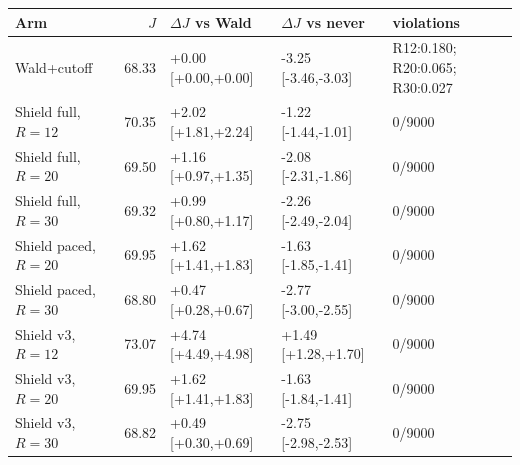 \begin{tabular}{@{}l r l l l@{}}
\toprule
Arm & $J$ & $\Delta J$ vs Wald & $\Delta J$ vs never & violations \\
\midrule
Wald+cutoff & 68.33 & +0.00 [+0.00,+0.00] & -3.25 [-3.46,-3.03] & R12:0.180; R20:0.065; R30:0.027 \\
Shield full, $R=12$ & 70.35 & +2.02 [+1.81,+2.24] & -1.22 [-1.44,-1.01] & 0/9000 \\
Shield full, $R=20$ & 69.50 & +1.16 [+0.97,+1.35] & -2.08 [-2.31,-1.86] & 0/9000 \\
Shield full, $R=30$ & 69.32 & +0.99 [+0.80,+1.17] & -2.26 [-2.49,-2.04] & 0/9000 \\
Shield paced, $R=20$ & 69.95 & +1.62 [+1.41,+1.83] & -1.63 [-1.85,-1.41] & 0/9000 \\
Shield paced, $R=30$ & 68.80 & +0.47 [+0.28,+0.67] & -2.77 [-3.00,-2.55] & 0/9000 \\
Shield v3, $R=12$ & 73.07 & +4.74 [+4.49,+4.98] & +1.49 [+1.28,+1.70] & 0/9000 \\
Shield v3, $R=20$ & 69.95 & +1.62 [+1.41,+1.83] & -1.63 [-1.84,-1.41] & 0/9000 \\
Shield v3, $R=30$ & 68.82 & +0.49 [+0.30,+0.69] & -2.75 [-2.98,-2.53] & 0/9000 \\
\bottomrule
\end{tabular}
